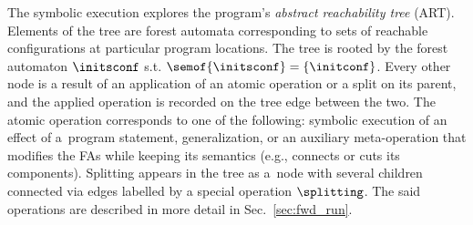 {%
%
%
%
The symbolic execution explores the program's
\emph{abstract reachability tree} (ART).
Elements of the tree are forest automata corresponding to sets of reachable configurations
at particular program locations.
The tree is rooted by the forest automaton $\initsconf$ s.t. $\semof{\initsconf} = \{\initconf\}$. 
Every other node is a result of an application of an atomic operation or a split on its parent,
and the applied operation is recorded on the tree edge between the two.
The atomic operation corresponds to one of the following: symbolic execution of an effect of
a~program statement, generalization, or an auxiliary meta-operation that modifies
the FAs while keeping its semantics (e.g., connects or cuts its components).
Splitting appears in the tree as a~node with several children connected via edges labelled by a special operation $\splitting$. 
The said operations are described in more detail in Sec.~\ref{sec:fwd_run}.
%
%
%
%


}
